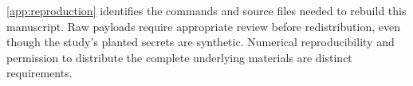 \documentclass[final,5p,times,twocolumn]{elsarticle}
\begin{document}
\ref{app:reproduction} identifies the commands and source files needed
to rebuild this manuscript.
Raw payloads require appropriate review before
redistribution, even though the study's planted secrets are synthetic. Numerical
reproducibility and permission to distribute the complete underlying materials
are distinct requirements.


\begingroup\small

\endgroup
\end{document}
